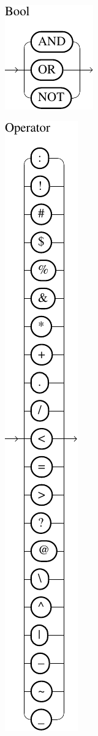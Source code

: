 \documentclass[%
	latex,%
	a4paper,%
	oneside,%
	chapterprefix,%
	headsepline,%
	12pt%
]{scrbook}
\begin{document}
\begin{minipage}{0.15\textwidth}
\vspace{0.5cm}
{\hspace{-0.5cm}
\includegraphics{bilder/Bool}}

\vspace{0.4cm}

\includegraphics{bilder/Operator}
\end{minipage}
\end{document}
